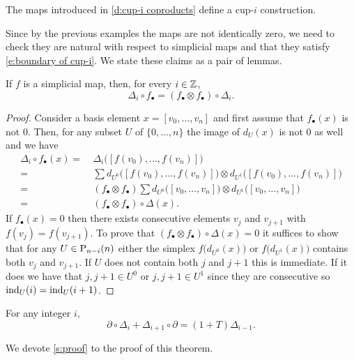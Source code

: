 \begin{theorem}
	The maps introduced in \cref{d:cup-i coproducts} define a cup-$i$ construction.
\end{theorem}

Since by the previous examples the maps are not identically zero, we need to check they are natural with respect to simplicial maps and that they satisfy \eqref{e:boundary of cup-i}.
We state these claims as a pair of lemmas.

\begin{lemma}
	If $f$ is a simplicial map, then, for every $i \in \Z$,
	\begin{equation*}
	\Delta_i \circ f_\bullet = (f_\bullet \otimes f_\bullet) \circ \Delta_i.
	\end{equation*}
\end{lemma}

\begin{proof}
	Consider a basis element $x = [v_0, \dots, v_n]$ and first assume that $f_\bullet(x)$ is not $0$.
	Then, for any subset $U$ of $\{0, \dots, n\}$ the image of $d_U(x)$ is not $0$ as well and we have
	\begin{align*}
	\Delta_i \circ f_\bullet(x) =\ &
	\Delta_i \big([f(v_0), \dots, f(v_n)]\big) \\ =\ &
	\sum d_{U^0} \big([f(v_0), \dots, f(v_n)]\big) \otimes d_{U^1} \big([f(v_0), \dots, f(v_n)]\big) \\ =\ &
	(f_\bullet \otimes f_\bullet) \sum d_{U^0} \big([v_0, \dots, v_n]\big) \otimes d_{U^1} \big([v_0, \dots, v_n]\big) \\ =\ &
	(f_\bullet \otimes f_\bullet) \circ \Delta(x).
	\end{align*}
	If $f_\bullet(x) = 0$ then there exists consecutive elements $v_j$ and $v_{j+1}$ with $f(v_j) = f(v_{j+1})$.
	To prove that $(f_\bullet \otimes f_\bullet) \circ \Delta(x) = 0$ it suffices to show that for any $U \in \P_{n-i}(n)$ either the simplex $f \big(d_{U^0}(x) \big)$ or $f \big( d_{U^1}(x) \big)$ contains both $v_j$ and $v_{j+1}$.
	If $U$ does not contain both $j$ and $j+1$ this is immediate.
	If it does we have that	$j, j+1 \in U^0$ or $j, j+1 \in U^1$ since they are consecutive so $\ind_U(i) = \ind_U(i+1)$.
\end{proof}

\begin{lemma} \label{l:main}
	For any integer $i$,
	\begin{equation} \label{eq: cup-i coproducts boundary relation}
	\partial \circ \Delta_{i} + \Delta_{i+1} \circ \partial = (1 +T ) \Delta_{i-1}.
	\end{equation}
\end{lemma}

We devote \cref{s:proof} to the proof of this theorem.